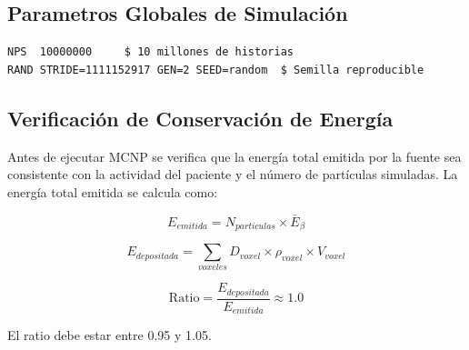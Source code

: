 \documentclass[12pt,a4paper]{article}
\begin{document}
\subsection{Parametros Globales de Simulación}

\begin{lstlisting}
NPS  10000000     $ 10 millones de historias
RAND STRIDE=1111152917 GEN=2 SEED=random  $ Semilla reproducible
\end{lstlisting}


\subsection{Verificación de Conservación de Energía}

Antes de ejecutar MCNP se verifica que la energía total emitida por la fuente sea consistente con la actividad del paciente y el número de partículas simuladas. La energía total emitida se calcula como:

$$
E_{emitida} = N_{particulas} \times \bar{E}_{\beta}
$$


$$
E_{depositada} = \sum_{voxeles} D_{voxel} \times \rho_{voxel} \times V_{voxel}
$$


$$
\text{Ratio} = \frac{E_{depositada}}{E_{emitida}} \approx 1.0
$$

El ratio debe estar entre 0.95 y 1.05.
\end{document}
